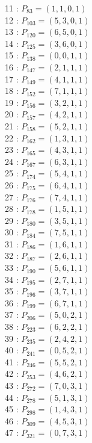 \documentclass{article}
\begin{document}
{\begin{multicols}{3}
11 : $P_{83}=( 1, 1, 0, 1 )$\\
12 : $P_{103}=( 5, 3, 0, 1 )$\\
13 : $P_{120}=( 6, 5, 0, 1 )$\\
14 : $P_{125}=( 3, 6, 0, 1 )$\\
15 : $P_{138}=( 0, 0, 1, 1 )$\\
16 : $P_{147}=( 2, 1, 1, 1 )$\\
17 : $P_{149}=( 4, 1, 1, 1 )$\\
18 : $P_{152}=( 7, 1, 1, 1 )$\\
19 : $P_{156}=( 3, 2, 1, 1 )$\\
20 : $P_{157}=( 4, 2, 1, 1 )$\\
21 : $P_{158}=( 5, 2, 1, 1 )$\\
22 : $P_{162}=( 1, 3, 1, 1 )$\\
23 : $P_{165}=( 4, 3, 1, 1 )$\\
24 : $P_{167}=( 6, 3, 1, 1 )$\\
25 : $P_{174}=( 5, 4, 1, 1 )$\\
26 : $P_{175}=( 6, 4, 1, 1 )$\\
27 : $P_{176}=( 7, 4, 1, 1 )$\\
28 : $P_{178}=( 1, 5, 1, 1 )$\\
29 : $P_{180}=( 3, 5, 1, 1 )$\\
30 : $P_{184}=( 7, 5, 1, 1 )$\\
31 : $P_{186}=( 1, 6, 1, 1 )$\\
32 : $P_{187}=( 2, 6, 1, 1 )$\\
33 : $P_{190}=( 5, 6, 1, 1 )$\\
34 : $P_{195}=( 2, 7, 1, 1 )$\\
35 : $P_{196}=( 3, 7, 1, 1 )$\\
36 : $P_{199}=( 6, 7, 1, 1 )$\\
37 : $P_{206}=( 5, 0, 2, 1 )$\\
38 : $P_{223}=( 6, 2, 2, 1 )$\\
39 : $P_{235}=( 2, 4, 2, 1 )$\\
40 : $P_{241}=( 0, 5, 2, 1 )$\\
41 : $P_{246}=( 5, 5, 2, 1 )$\\
42 : $P_{253}=( 4, 6, 2, 1 )$\\
43 : $P_{272}=( 7, 0, 3, 1 )$\\
44 : $P_{278}=( 5, 1, 3, 1 )$\\
45 : $P_{298}=( 1, 4, 3, 1 )$\\
46 : $P_{309}=( 4, 5, 3, 1 )$\\
47 : $P_{321}=( 0, 7, 3, 1 )$\\

\end{multicols}}
\end{document}
